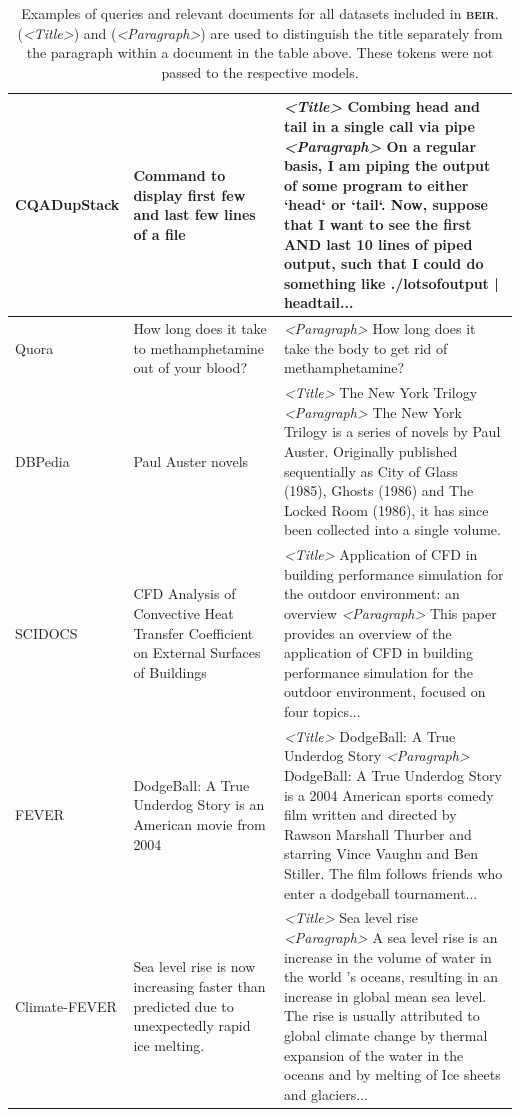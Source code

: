 \documentclass{article}
\newcommand{\custo}[1]{\textsc{\normalsize #1}}
\newcommand{\beir}{\custo{beir}\xspace}
\begin{document}
\begin{table}[t!]
{\begin{tabular}{l | l | l }
   CQADupStack   & \multicolumn{1}{p{6cm}|}{Command to display first few and last few lines of a file} & \multicolumn{1}{p{13cm}}{\textit{<Title>} Combing head and tail in a single call via pipe \textit{<Paragraph>} On a regular basis, I am piping the output of some program to either `head` or `tail`. Now, suppose that I want to see the first AND last 10 lines of piped output, such that I could do something like ./lotsofoutput | headtail...} \\ \midrule
   Quora         & \multicolumn{1}{p{6cm}|}{How long does it take to methamphetamine out of your blood?} & \multicolumn{1}{p{13cm}}{\textit{<Paragraph>} How long does it take the body to get rid of methamphetamine?} \\ \midrule
   DBPedia       & \multicolumn{1}{p{6cm}|}{Paul Auster novels} & \multicolumn{1}{p{13cm}}{\textit{<Title>} The New York Trilogy \textit{<Paragraph>} The New York Trilogy is a series of novels by Paul Auster.  Originally published sequentially as City of Glass (1985), Ghosts (1986) and The Locked Room (1986), it has since been collected into a single volume.} \\ \midrule
   SCIDOCS       & \multicolumn{1}{p{6cm}|}{CFD Analysis of Convective Heat Transfer Coefficient on External Surfaces of Buildings} & \multicolumn{1}{p{13cm}}{ \textit{<Title>} Application of CFD in building performance simulation for the outdoor environment: an overview \textit{<Paragraph>} This paper provides an overview of the application of CFD in building performance simulation for the outdoor environment, focused on four topics...} \\ \midrule
   FEVER         & \multicolumn{1}{p{6cm}|}{DodgeBall: A True Underdog Story is an American movie from 2004} & \multicolumn{1}{p{13cm}}{\textit{<Title>} DodgeBall: A True Underdog Story \textit{<Paragraph>} DodgeBall: A True Underdog Story is a 2004 American sports comedy film written and directed by Rawson Marshall Thurber and starring Vince Vaughn and Ben Stiller. The film follows friends who enter a dodgeball tournament... } \\ \midrule
   Climate-FEVER & \multicolumn{1}{p{6cm}|}{Sea level rise is now increasing faster than predicted due to unexpectedly rapid ice melting.} & \multicolumn{1}{p{13cm}}{\textit{<Title>} Sea level rise \textit{<Paragraph>} A sea level rise is an increase in the volume of water in the world 's oceans, resulting in an increase in global mean sea level. The rise is usually attributed to global climate change by thermal expansion of the water in the oceans and by melting of Ice sheets and glaciers...}\\ \bottomrule
    \end{tabular}}
    \caption{Examples of queries and relevant documents for all datasets included in \textbf{\beir}. (\textit{<Title>}) and (\textit{<Paragraph>}) are used to distinguish the title separately from the paragraph within a document in the table above. These tokens were not passed to the respective models.}
    \label{tab:examples}
\end{table}
\end{document}
